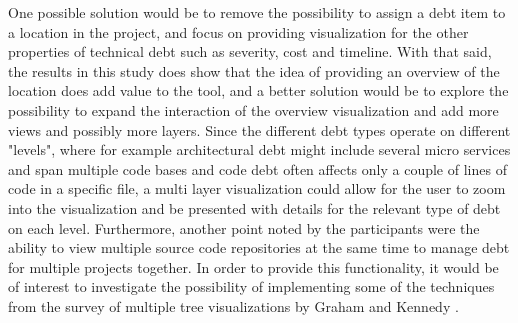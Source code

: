 One possible solution would be to remove the possibility to assign a debt item to a location in the project, and focus on providing visualization for the other properties of technical debt such as severity, cost and timeline.
With that said, the results in this study does show that the idea of providing an overview of the location does add value to the tool, and a better solution would be to explore the possibility to expand the interaction of the overview visualization and add more views and possibly more layers.
Since the different debt types operate on different "levels", where for example architectural debt might include several micro services and span multiple code bases and code debt often affects only a couple of lines of code in a specific file, a multi layer visualization could allow for the user to zoom into the visualization and be presented with details for the relevant type of debt on each level.
Furthermore, another point noted by the participants were the ability to view multiple source code repositories at the same time to manage debt for multiple projects together.
In order to provide this functionality, it would be of interest to investigate the possibility of implementing some of the techniques from the survey of multiple tree visualizations by Graham and Kennedy \cite{graham_survey_2010}.


